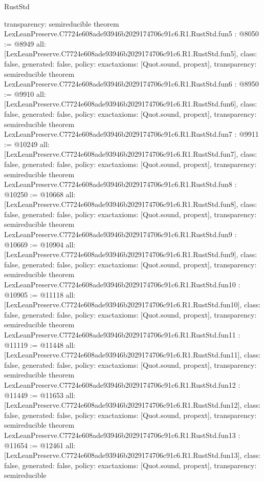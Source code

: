 \begin{lexlean}{RustStd}
\begin{coremodule}
{  transparency: semireducible
}
theorem LexLeanPreserve.C7724e608ade93946b2029174706c91c6.R1.RustStd.fun5 : @8050 := @8949 {
  all: [LexLeanPreserve.C7724e608ade93946b2029174706c91c6.R1.RustStd.fun5],
  class: false,
  generated: false,
  policy: exact{axioms: [Quot.sound, propext]},
  transparency: semireducible
}
theorem LexLeanPreserve.C7724e608ade93946b2029174706c91c6.R1.RustStd.fun6 : @8950 := @9910 {
  all: [LexLeanPreserve.C7724e608ade93946b2029174706c91c6.R1.RustStd.fun6],
  class: false,
  generated: false,
  policy: exact{axioms: [Quot.sound, propext]},
  transparency: semireducible
}
theorem LexLeanPreserve.C7724e608ade93946b2029174706c91c6.R1.RustStd.fun7 : @9911 := @10249 {
  all: [LexLeanPreserve.C7724e608ade93946b2029174706c91c6.R1.RustStd.fun7],
  class: false,
  generated: false,
  policy: exact{axioms: [Quot.sound, propext]},
  transparency: semireducible
}
theorem LexLeanPreserve.C7724e608ade93946b2029174706c91c6.R1.RustStd.fun8 : @10250 := @10668 {
  all: [LexLeanPreserve.C7724e608ade93946b2029174706c91c6.R1.RustStd.fun8],
  class: false,
  generated: false,
  policy: exact{axioms: [Quot.sound, propext]},
  transparency: semireducible
}
theorem LexLeanPreserve.C7724e608ade93946b2029174706c91c6.R1.RustStd.fun9 : @10669 := @10904 {
  all: [LexLeanPreserve.C7724e608ade93946b2029174706c91c6.R1.RustStd.fun9],
  class: false,
  generated: false,
  policy: exact{axioms: [Quot.sound, propext]},
  transparency: semireducible
}
theorem LexLeanPreserve.C7724e608ade93946b2029174706c91c6.R1.RustStd.fun10 : @10905 := @11118 {
  all: [LexLeanPreserve.C7724e608ade93946b2029174706c91c6.R1.RustStd.fun10],
  class: false,
  generated: false,
  policy: exact{axioms: [Quot.sound, propext]},
  transparency: semireducible
}
theorem LexLeanPreserve.C7724e608ade93946b2029174706c91c6.R1.RustStd.fun11 : @11119 := @11448 {
  all: [LexLeanPreserve.C7724e608ade93946b2029174706c91c6.R1.RustStd.fun11],
  class: false,
  generated: false,
  policy: exact{axioms: [Quot.sound, propext]},
  transparency: semireducible
}
theorem LexLeanPreserve.C7724e608ade93946b2029174706c91c6.R1.RustStd.fun12 : @11449 := @11653 {
  all: [LexLeanPreserve.C7724e608ade93946b2029174706c91c6.R1.RustStd.fun12],
  class: false,
  generated: false,
  policy: exact{axioms: [Quot.sound, propext]},
  transparency: semireducible
}
theorem LexLeanPreserve.C7724e608ade93946b2029174706c91c6.R1.RustStd.fun13 : @11654 := @12461 {
  all: [LexLeanPreserve.C7724e608ade93946b2029174706c91c6.R1.RustStd.fun13],
  class: false,
  generated: false,
  policy: exact{axioms: [Quot.sound, propext]},
  transparency: semireducible
}
\end{coremodule}
\end{lexlean}
